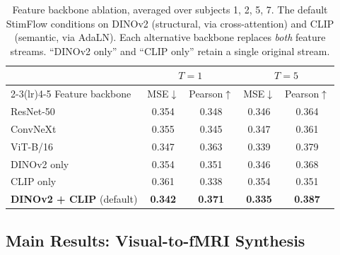 \documentclass[runningheads]{llncs}
\begin{document}
\begin{table}[tb]
  \caption{Feature backbone ablation, averaged over subjects 1, 2, 5, 7.
    The default StimFlow conditions on DINOv2 (structural, via cross-attention) and
    CLIP (semantic, via AdaLN).
    Each alternative backbone replaces \emph{both} feature streams.
    ``DINOv2 only'' and ``CLIP only'' retain a single original stream.}
  \label{tab:abl-backbone}
  \centering
  \setlength{\tabcolsep}{6pt}
  \begin{tabular}{@{}lcccc@{}}
    \toprule
    & \multicolumn{2}{c}{$T{=}1$} & \multicolumn{2}{c}{$T{=}5$}\\
    \cmidrule(lr){2-3}\cmidrule(lr){4-5}
    Feature backbone & MSE$\downarrow$ & Pearson$\uparrow$ & MSE$\downarrow$ & Pearson$\uparrow$\\
    \midrule
    ResNet-50        & 0.354 & 0.348 & 0.346 & 0.364 \\
    ConvNeXt         & 0.355 & 0.345 & 0.347 & 0.361 \\
    ViT-B/16         & 0.347 & 0.363 & 0.339 & 0.379 \\
    \midrule
    DINOv2 only      & 0.354 & 0.351 & 0.346 & 0.368 \\
    CLIP only        & 0.361 & 0.338 & 0.354 & 0.351 \\
    \midrule
    \textbf{DINOv2 + CLIP} (default) & \textbf{0.342} & \textbf{0.371} & \textbf{0.335} & \textbf{0.387} \\
    \bottomrule
  \end{tabular}
\end{table}

\subsection{Main Results: Visual-to-fMRI Synthesis}
\label{sec:exp-main}
\end{document}
